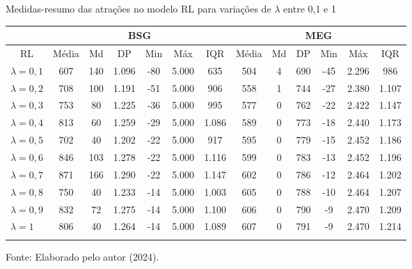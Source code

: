 \begin{tabela}[H]
	\small
	\centering
	\caption{Medidas-resumo das atrações no modelo RL para variações de $\lambda$ entre 0,1 e 1}
	\begin{tabular}{l|c c c c c c|c c c c c c}
		\Xhline{2\arrayrulewidth}
		& \multicolumn{6}{c|}{BSG} & \multicolumn{6}{c}{MEG} \\ \hline
		\multicolumn{1}{c|}{RL} & Média & Md & DP & Min & Máx & IQR & Média & Md & DP & Min & Máx & IQR \\ \hline
		$\lambda = 0,1$ & 607 & 140 & 1.096 & -80 & 5.000 & 635 & 504 & 4 & 690 & -45 & 2.296 & 986 \\
		$\lambda = 0,2$ & 708 & 100 & 1.191 & -51 & 5.000 & 906 & 558 & 1 & 744 & -27 & 2.380 & 1.107 \\
		$\lambda = 0,3$ & 753 & 80 & 1.225 & -36 & 5.000 & 995 & 577 & 0 & 762 & -22 & 2.422 & 1.147 \\
		$\lambda = 0,4$ & 813 & 60 & 1.259 & -29 & 5.000 & 1.086 & 589 & 0 & 773 & -18 & 2.440 & 1.173 \\
		$\lambda = 0,5$ & 702 & 40 & 1.202 & -22 & 5.000 & 917 & 595 & 0 & 779 & -15 & 2.452 & 1.186 \\
		$\lambda = 0,6$ & 846 & 103 & 1.278 & -22 & 5.000 & 1.116 & 599 & 0 & 783 & -13 & 2.452 & 1.196 \\
		$\lambda = 0,7$ & 871 & 166 & 1.290 & -22 & 5.000 & 1.147 & 602 & 0 & 786 & -12 & 2.464 & 1.202 \\
		$\lambda = 0,8$ & 750 & 40 & 1.233 & -14 & 5.000 & 1.003 & 605 & 0 & 788 & -10 & 2.464 & 1.207 \\
		$\lambda = 0,9$ & 832 & 72 & 1.275 & -14 & 5.000 & 1.100 & 606 & 0 & 790 & -9 & 2.470 & 1.209 \\
		$\lambda = 1$ & 806 & 40 & 1.264 & -14 & 5.000 & 1.089 & 607 & 0 & 791 & -9 & 2.470 & 1.214 \\
		\Xhline{2\arrayrulewidth}
	\end{tabular}
	\label{tabela_5}
	\caption*{\fontsize{10}{12}\selectfont Fonte: Elaborado pelo autor (2024).}
\end{tabela}
